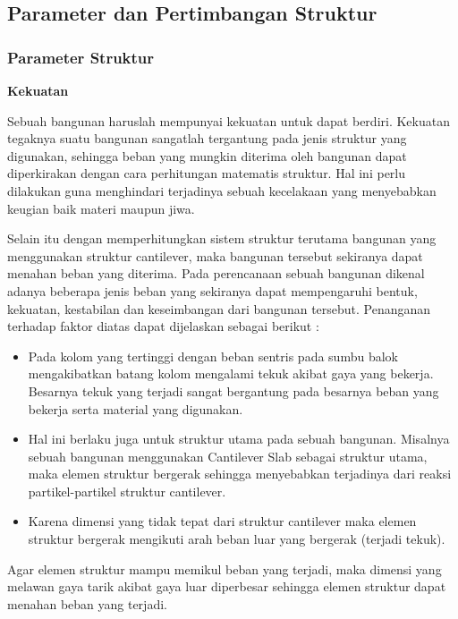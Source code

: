 \documentclass[../main.tex]{subfiles}
\begin{document}
\subsection{Parameter dan Pertimbangan Struktur}%
\label{sub:Parameter dan Pertimbangan Struktur}

\subsubsection{Parameter Struktur}%
\label{ssub:Parameter Struktur}

\textbf{Kekuatan}

Sebuah bangunan haruslah mempunyai kekuatan untuk dapat berdiri. Kekuatan tegaknya suatu bangunan sangatlah tergantung pada jenis struktur yang digunakan, sehingga beban yang mungkin diterima oleh bangunan dapat diperkirakan dengan cara perhitungan matematis struktur. Hal ini perlu dilakukan guna menghindari terjadinya sebuah kecelakaan yang menyebabkan keugian baik materi maupun jiwa.

Selain itu dengan memperhitungkan sistem struktur terutama bangunan yang menggunakan struktur cantilever, maka bangunan tersebut sekiranya dapat menahan beban yang diterima. Pada perencanaan sebuah bangunan dikenal adanya beberapa jenis beban yang sekiranya dapat mempengaruhi bentuk, kekuatan, kestabilan dan keseimbangan dari bangunan tersebut. Penanganan terhadap faktor diatas dapat dijelaskan sebagai berikut :

\begin{itemize}
	\item Pada kolom yang tertinggi dengan beban sentris pada sumbu balok mengakibatkan batang kolom mengalami tekuk akibat gaya yang bekerja. Besarnya tekuk yang terjadi sangat bergantung pada besarnya beban yang bekerja serta material yang digunakan.
	\item Hal ini berlaku juga untuk struktur utama pada sebuah bangunan. Misalnya sebuah bangunan menggunakan Cantilever Slab sebagai struktur utama, maka elemen struktur bergerak sehingga menyebabkan terjadinya dari reaksi partikel-partikel struktur cantilever.
	\item Karena dimensi yang tidak tepat dari struktur cantilever maka elemen struktur bergerak mengikuti arah beban luar yang bergerak (terjadi tekuk).
\end{itemize}

Agar elemen struktur mampu memikul beban yang terjadi, maka dimensi yang melawan gaya tarik akibat gaya luar diperbesar sehingga elemen struktur dapat menahan beban yang terjadi.
\end{document}
